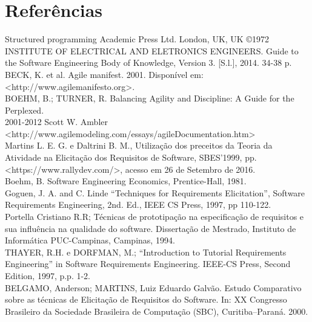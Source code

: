 
\chapter[Referências]{Referências}

Structured programming  Academic Press Ltd. London, UK, UK ©1972\\

INSTITUTE OF ELECTRICAL AND ELETRONICS ENGINEERS. Guide to the Software Engineering Body of Knowledge, Version 3. [S.l.], 2014. 34-38 p.\\

BECK, K. et al. Agile manifest. 2001. Disponível em: \\<http://www.agilemanifesto.org>.\\

BOEHM, B.; TURNER, R. Balancing Agility and Discipline: A Guide for the Perplexed.\\

2001-2012 Scott W. Ambler \\<http://www.agilemodeling.com/essays/agileDocumentation.htm>\\

Martins L. E. G. e Daltrini B. M., Utilização dos preceitos da Teoria da Atividade na Elicitação dos Requisitos de Software, SBES’1999, pp.\\

<https://www.rallydev.com/>, acesso em 26 de Setembro de 2016.\\
Boehm, B. Software Engineering Economics, Prentice-Hall, 1981.\\

Goguen, J. A. and C. Linde “Techniques for Requirements Elicitation”, Software Requirements Engineering, 2nd. Ed., IEEE CS Press, 1997, pp 110-122.\\

Portella Cristiano R.R; Técnicas de prototipação na especificação de requisitos e sua influência na qualidade do software. Dissertação de Mestrado, Instituto de Informática PUC-Campinas, Campinas, 1994.\\

THAYER, R.H. e DORFMAN, M.; “Introduction to Tutorial Requirements Engineering” in Software Requirements Engineering. IEEE-CS Press, Second Edition, 1997, p.p. 1-2.\\

BELGAMO, Anderson; MARTINS, Luiz Eduardo Galvão. Estudo Comparativo sobre as técnicas de Elicitação de Requisitos do Software. In: XX Congresso Brasileiro da Sociedade Brasileira de Computação (SBC), Curitiba–Paraná. 2000.\\

